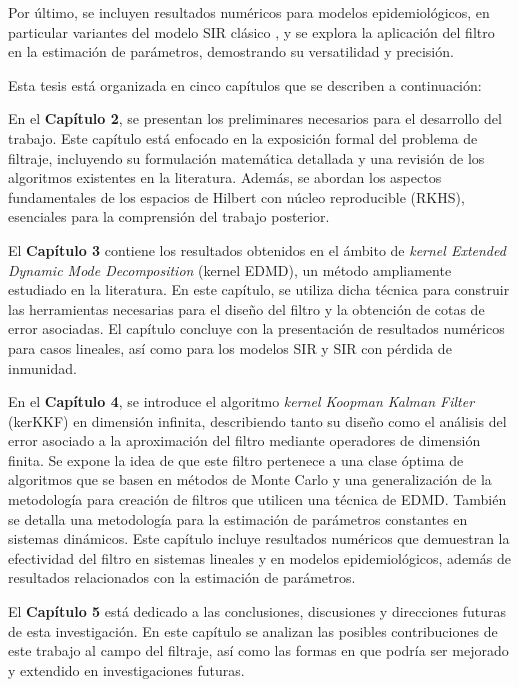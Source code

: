 Por último, se incluyen resultados numéricos para modelos epidemiológicos, en particular variantes del modelo SIR clásico \cite{Hethcote1989ThreeModels, Grassly2008MathematicalTransmission}, y se explora la aplicación del filtro en la estimación de parámetros, demostrando su versatilidad y precisión.

Esta tesis está organizada en cinco capítulos que se describen a continuación:

En el \textbf{Capítulo 2}, se presentan los preliminares necesarios para el desarrollo del trabajo. Este capítulo está enfocado en la exposición formal del problema de filtraje, incluyendo su formulación matemática detallada y una revisión de los algoritmos existentes en la literatura. Además, se abordan los aspectos fundamentales de los espacios de Hilbert con núcleo reproducible (RKHS), esenciales para la comprensión del trabajo posterior.

El \textbf{Capítulo 3} contiene los resultados obtenidos en el ámbito de \textit{kernel Extended Dynamic Mode Decomposition} (kernel EDMD), un método ampliamente estudiado en la literatura. En este capítulo, se utiliza dicha técnica para construir las herramientas necesarias para el diseño del filtro y la obtención de cotas de error asociadas. El capítulo concluye con la presentación de resultados numéricos para casos lineales, así como para los modelos SIR y SIR con pérdida de inmunidad.

En el \textbf{Capítulo 4}, se introduce el algoritmo \textit{kernel Koopman Kalman Filter} (kerKKF) en dimensión infinita, describiendo tanto su diseño como el análisis del error asociado a la aproximación del filtro mediante operadores de dimensión finita. Se expone la idea de que este filtro pertenece a una clase óptima de algoritmos que se basen en métodos de Monte Carlo y una generalización de la metodología para creación de filtros que utilicen una técnica de EDMD. También se detalla una metodología para la estimación de parámetros constantes en sistemas dinámicos. Este capítulo incluye resultados numéricos que demuestran la efectividad del filtro en sistemas lineales y en modelos epidemiológicos, además de resultados relacionados con la estimación de parámetros.

El \textbf{Capítulo 5} está dedicado a las conclusiones, discusiones y direcciones futuras de esta investigación. En este capítulo se analizan las posibles contribuciones de este trabajo al campo del filtraje, así como las formas en que podría ser mejorado y extendido en investigaciones futuras.

